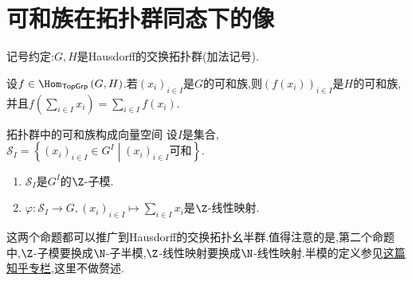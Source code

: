 \section{可和族在拓扑群同态下的像}

记号约定:$G,H$是Hausdorff的交换拓扑群(加法记号).

\begin{proposition}{}{}
	设$f\in\Hom_{\mathsf{TopGrp}}\left(G,H\right)$.若$\left(x_{i}\right)_{i\in I}$是$G$的可和族,则$\left(f\left(x_{i}\right)\right)_{i\in I}$是$H$的可和族,并且$f\left(\sum\limits_{i\in I}x_{i}\right)=\sum\limits_{i\in I}f\left(x_{i}\right)$.
\end{proposition}

\begin{proposition}{拓扑群中的可和族构成向量空间}{}
	设$I$是集合,$\mathcal{S}_{I}=\left\{\left(x_{i}\right)_{i\in I}\in G^{I}\middle|\left(x_{i}\right)_{i\in I}\text{可和}\right\}$.
	\begin{enumerate}
		\item $\mathcal{S}_{I}$是$G^{I}$的$\Z$-子模.
		\item $\varphi:\mathcal{S}_{I}\to G,\left(x_{i}\right)_{i\in I}\mapsto\sum\limits_{i\in I}x_{i}$是$\Z$-线性映射.
	\end{enumerate}
\end{proposition}

\begin{remark}{}{}
	这两个命题都可以推广到Hausdorff的交换拓扑幺半群.值得注意的是,第二个命题中,$\Z$-子模要换成$\N$-子半模,$\Z$-线性映射要换成$\N$-线性映射.半模的定义参见\href{https://zhuanlan.zhihu.com/p/1920469493227956098}{这篇知乎专栏},这里不做赘述.
\end{remark}